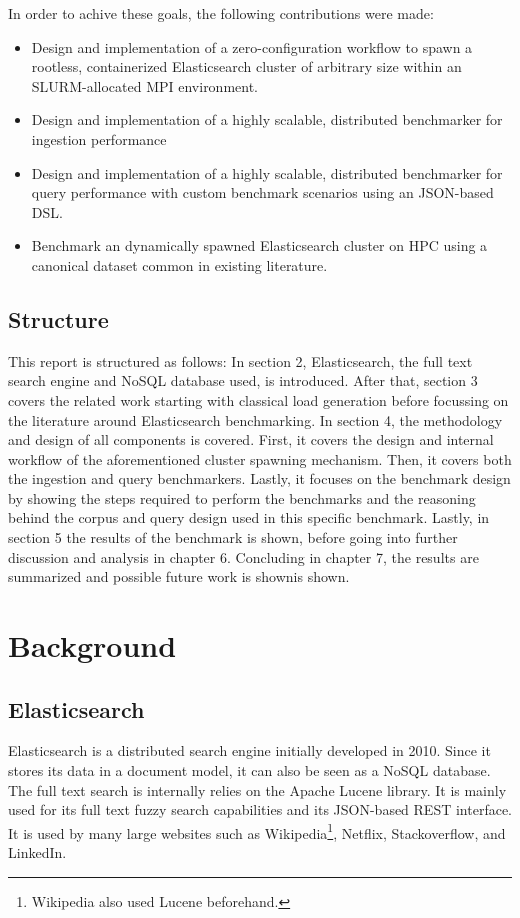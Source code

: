 In order to achive these goals, the following contributions were made:

\begin{itemize}
\item Design and implementation of a zero-configuration workflow to spawn a rootless, containerized Elasticsearch cluster of arbitrary size within an SLURM-allocated \ac{MPI} environment.
\item Design and implementation of a highly scalable, distributed benchmarker for ingestion performance
\item Design and implementation of a highly scalable, distributed benchmarker for query performance with custom benchmark scenarios using an JSON-based \ac{DSL}.
\item Benchmark an dynamically spawned Elasticsearch cluster on \ac{HPC} using a canonical dataset common in existing literature.
\end{itemize}
\subsection{Structure}
This report is structured as follows: In section 2, Elasticsearch, the full text search engine and NoSQL database used, is introduced. After that, section 3 covers the related work starting with classical load generation before focussing on the literature around Elasticsearch benchmarking. In section 4, the methodology and design of all components is covered. First, it covers the design and internal workflow of the aforementioned cluster spawning mechanism. Then, it covers both the ingestion and query benchmarkers. Lastly, it focuses on the benchmark design by showing the steps required to perform the benchmarks and the reasoning behind the corpus and query design used in this specific benchmark. Lastly, in section 5 the results of the benchmark is shown, before going into further discussion and analysis in chapter 6. Concluding in chapter 7, the results are summarized and possible future work is shownis shown.

\section{Background}
\subsection{Elasticsearch}
Elasticsearch is a distributed search engine initially developed in 2010. Since it stores its data in a document model, it can also be seen as a NoSQL database. The full text search is internally relies on the Apache Lucene library. It is mainly used for its full text fuzzy search capabilities and its JSON-based REST interface. It is used by many large websites such as Wikipedia\footnote{Wikipedia also used Lucene beforehand.}, Netflix, Stackoverflow, and LinkedIn.

